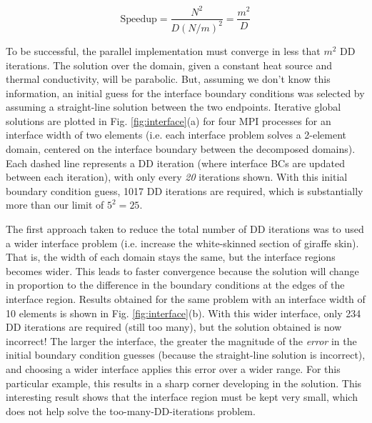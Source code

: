 \documentclass[10pt]{article}
\newcommand{\beq}{\begin{equation}}
\newcommand{\eeq}{\end{equation}}
\begin{document}
\beq
\textrm{Speedup}=\frac{N^2}{D(N/m)^2}=\frac{m^2}{D}
\eeq

To be successful, the parallel implementation must converge in less that \(m^2\) DD iterations. The solution over the domain, given a constant heat source and thermal conductivity, will be parabolic. But, assuming we don't know this information, an initial guess for the interface boundary conditions was selected by assuming a straight-line solution between the two endpoints. Iterative global solutions are plotted in Fig. \ref{fig:interface}(a) for four MPI processes for an interface width of two elements (i.e. each interface problem solves a 2-element domain, centered on the interface boundary between the decomposed domains). Each dashed line represents a DD iteration (where interface BCs are updated between each iteration), with only every {\it 20} iterations shown. With this initial boundary condition guess, 1017 DD iterations are required, which is substantially more than our limit of \(5^2=25\). 

The first approach taken to reduce the total number of DD iterations was to used a wider interface problem (i.e. increase the white-skinned section of giraffe skin). That is, the width of each domain stays the same, but the interface regions becomes wider. This leads to faster convergence because the solution will change in proportion to the difference in the boundary conditions at the edges of the interface region. Results obtained for the same problem with an interface width of 10 elements is shown in Fig. \ref{fig:interface}(b). With this wider interface, only 234 DD iterations are required (still too many), but the solution obtained is now incorrect! The larger the interface, the greater the magnitude of the {\it error} in the initial boundary condition guesses (because the straight-line solution is incorrect), and choosing a wider interface applies this error over a wider range. For this particular example, this results in a sharp corner developing in the solution. This interesting result shows that the interface region must be kept very small, which does not help solve the too-many-DD-iterations problem.
\end{document}
